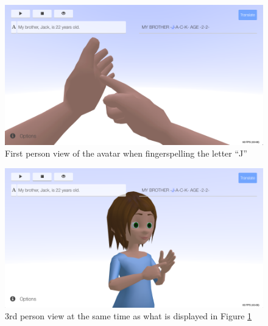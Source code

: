 \documentclass[12pt]{ociamthesis}  %
\begin{document}
{\begin{figure}[h]
	\centering
    \includegraphics[scale=0.45]{appendix/fpv}
    \caption{First person view of the avatar when fingerspelling the letter ``J''}
    \label{fig:fpv}
\end{figure}
\begin{figure}[h]
	\centering
    \includegraphics[scale=0.45]{appendix/3rd}
    \caption{3rd person view at the same time as what is displayed in Figure \ref{fig:fpv}}
    \label{fig:3rd}
\end{figure}

}
\end{document}
